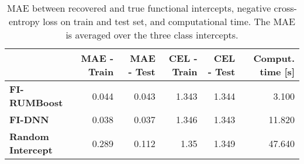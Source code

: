 \begin{table}[htbp]
\caption{MAE between recovered and true functional intercepts, negative cross-entropy loss on train and test set, and computational time. The MAE is averaged over the three class intercepts.}
\label{tab:synthetic_benchmark}
\begin{tabular}{lrrrrr}
\toprule
 & MAE - Train & MAE - Test & CEL - Train & CEL - Test & Comput. time [s] \\
\midrule
\textbf{FI-RUMBoost} & 0.044 & 0.043 & 1.343 & 1.344 & 3.100 \\
\textbf{FI-DNN} & 0.038 & 0.037 & 1.346 & 1.343 & 11.820 \\
\textbf{Random Intercept} & 0.289 & 0.112 & 1.35 & 1.349 & 47.640 \\
\bottomrule
\end{tabular}
\end{table}
